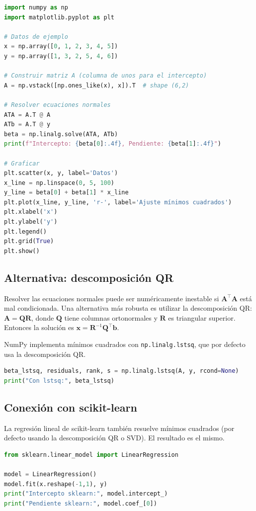 \documentclass[12pt,a4paper,openany,oneside]{book}
\begin{document}
\begin{lstlisting}[language=Python]
import numpy as np
import matplotlib.pyplot as plt

# Datos de ejemplo
x = np.array([0, 1, 2, 3, 4, 5])
y = np.array([1, 3, 2, 5, 4, 6])

# Construir matriz A (columna de unos para el intercepto)
A = np.vstack([np.ones_like(x), x]).T  # shape (6,2)

# Resolver ecuaciones normales
ATA = A.T @ A
ATb = A.T @ y
beta = np.linalg.solve(ATA, ATb)
print(f"Intercepto: {beta[0]:.4f}, Pendiente: {beta[1]:.4f}")

# Graficar
plt.scatter(x, y, label='Datos')
x_line = np.linspace(0, 5, 100)
y_line = beta[0] + beta[1] * x_line
plt.plot(x_line, y_line, 'r-', label='Ajuste mínimos cuadrados')
plt.xlabel('x')
plt.ylabel('y')
plt.legend()
plt.grid(True)
plt.show()
\end{lstlisting}

\subsection{Alternativa: descomposición QR}
Resolver las ecuaciones normales puede ser numéricamente inestable si $\mathbf{A}^\top \mathbf{A}$ está mal condicionada. Una alternativa más robusta es utilizar la descomposición QR: $\mathbf{A} = \mathbf{Q}\mathbf{R}$, donde $\mathbf{Q}$ tiene columnas ortonormales y $\mathbf{R}$ es triangular superior. Entonces la solución es $\mathbf{x} = \mathbf{R}^{-1}\mathbf{Q}^\top \mathbf{b}$.

NumPy implementa mínimos cuadrados con \texttt{np.linalg.lstsq}, que por defecto usa la descomposición QR.

\begin{lstlisting}[language=Python]
beta_lstsq, residuals, rank, s = np.linalg.lstsq(A, y, rcond=None)
print("Con lstsq:", beta_lstsq)
\end{lstlisting}

\subsection{Conexión con scikit-learn}
La regresión lineal de scikit-learn también resuelve mínimos cuadrados (por defecto usando la descomposición QR o SVD). El resultado es el mismo.

\begin{lstlisting}[language=Python]
from sklearn.linear_model import LinearRegression

model = LinearRegression()
model.fit(x.reshape(-1,1), y)
print("Intercepto sklearn:", model.intercept_)
print("Pendiente sklearn:", model.coef_[0])
\end{lstlisting}
\end{document}
